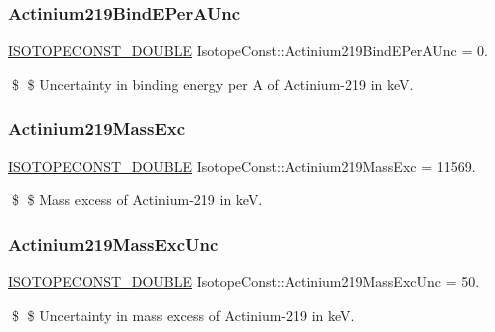 \subsubsection{\texorpdfstring{Actinium219\+Bind\+E\+Per\+A\+Unc}{Actinium219BindEPerAUnc}}
{\footnotesize\ttfamily \mbox{\hyperlink{group___isotope_const-_macros_ga8f45a7272ce02c0b4c65c44636ed719a}{I\+S\+O\+T\+O\+P\+E\+C\+O\+N\+S\+T\+\_\+\+D\+O\+U\+B\+LE}} Isotope\+Const\+::\+Actinium219\+Bind\+E\+Per\+A\+Unc = 0.}

\$ \$ Uncertainty in binding energy per A of Actinium-\/219 in keV. \mbox{\label{group___isotope_const-_actinium-_ac219_gab9ffe32621b24e3e3148447e00e9cbed}} 
\subsubsection{\texorpdfstring{Actinium219\+Mass\+Exc}{Actinium219MassExc}}
{\footnotesize\ttfamily \mbox{\hyperlink{group___isotope_const-_macros_ga8f45a7272ce02c0b4c65c44636ed719a}{I\+S\+O\+T\+O\+P\+E\+C\+O\+N\+S\+T\+\_\+\+D\+O\+U\+B\+LE}} Isotope\+Const\+::\+Actinium219\+Mass\+Exc = 11569.}

\$ \$ Mass excess of Actinium-\/219 in keV. \mbox{\label{group___isotope_const-_actinium-_ac219_ga1951db0d5c506461a67d7bfaaa3f2dd3}} 
\subsubsection{\texorpdfstring{Actinium219\+Mass\+Exc\+Unc}{Actinium219MassExcUnc}}
{\footnotesize\ttfamily \mbox{\hyperlink{group___isotope_const-_macros_ga8f45a7272ce02c0b4c65c44636ed719a}{I\+S\+O\+T\+O\+P\+E\+C\+O\+N\+S\+T\+\_\+\+D\+O\+U\+B\+LE}} Isotope\+Const\+::\+Actinium219\+Mass\+Exc\+Unc = 50.}

\$ \$ Uncertainty in mass excess of Actinium-\/219 in keV. \mbox{\label{group___isotope_const-_actinium-_ac219_ga01965433e6d269f71d035dfaaaf7b50d}} 
